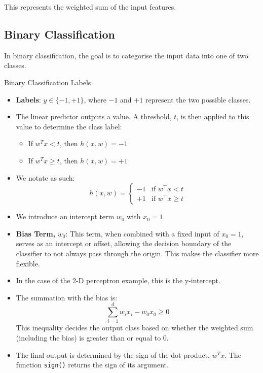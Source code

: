 \noindent
This represents the weighted sum of the input features.

\subsection{Binary Classification}
In binary classification, the goal is to categorise the input data into one of two classes.

\begin{definitionbox}{Binary Classification Labels}
    \begin{itemize}
    \item \textbf{Labels}: $y \in \{-1, +1\}$, where $-1$ and $+1$ represent the two possible classes.
    \item The linear predictor outputs a value. A threshold, $t$, is then applied to this value to determine the class label:
    \begin{itemize}
        \item If $w^T x < t$, then $h(x, w) = -1$
        \item If $w^T x \geq t$, then $h(x, w) = +1$
    \end{itemize}
    \item We notate as such: $$
    h(x, w) = 
\begin{cases} 
-1 & \text{if } w^\top x < t \\
+1 & \text{if } w^\top x \geq  t
\end{cases}
    $$
    \item We introduce an intercept term $w_0$ with $x_0 = 1$.
    \item \textbf{Bias Term,} $w_0$: This term, when combined with a fixed input of $x_0=1$, serves as an intercept or offset, allowing the decision boundary of the classifier to not always pass through the origin. This makes the classifier more flexible.
    \item In the case of the 2-D perceptron example, this is the y-intercept.
    \item The summation with the bias is:
    $$
    \sum_{i=1}^{d} w_ix_i - w_0x_0 \geq 0
    $$
    This inequality decides the output class based on whether the weighted sum (including the bias) is greater than or equal to 0.
    \item The final output is determined by the sign of the dot product, $w^T x$. The function \texttt{sign()} returns the sign of its argument.
\end{itemize}
\end{definitionbox}


